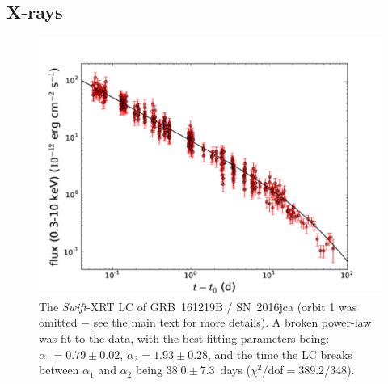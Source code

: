 \documentclass[traditabstract,longauth]{aa}
\begin{document}
\subsection{X-rays}

\begin{figure}
   \includegraphics[width=\columnwidth]{Fig3_XRT-eps-converted-to.pdf}
      \caption{The \emph{Swift}-XRT LC of GRB~161219B / SN~2016jca (orbit 1 was omitted $-$ see the main text for more details).  A broken power-law was fit to the data, with the best-fitting parameters being: $\alpha_{1} = 0.79\pm0.02$, $\alpha_{2} = 1.93\pm0.28$, and the time the LC breaks between $\alpha_{1}$ and $\alpha_{2}$ being $38.0\pm7.3$~days ($\chi^2/$dof$ = 389.2/348$).  }
         \label{FigXRT}
\end{figure}

\end{document}

